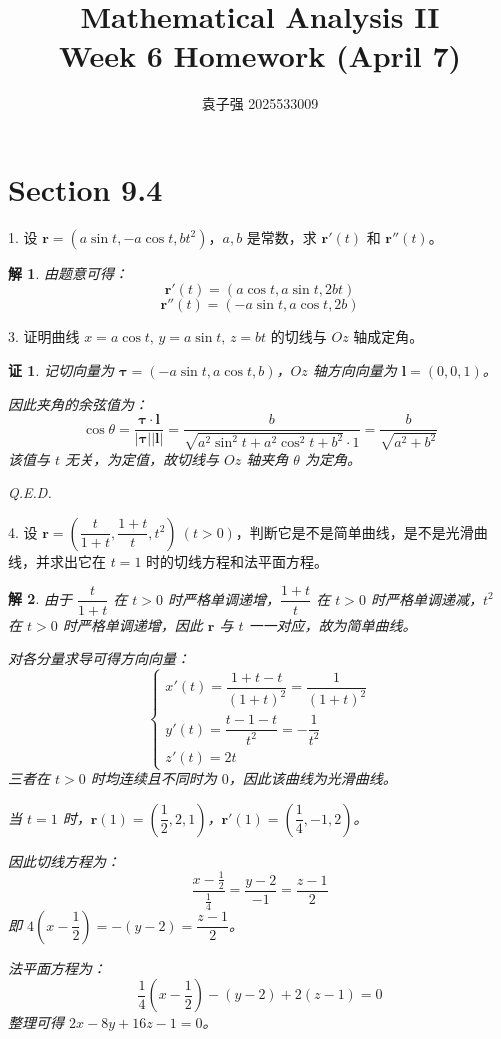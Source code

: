 \documentclass[a4paper,12pt]{article}
\title{Mathematical Analysis II\\Week 6 Homework (April 7)}
\author{袁子强\hspace{1cm} 2025533009}
\newtheorem*{pf}{证}
\newtheorem*{sol}{解}
\begin{document}
\maketitle

\section*{Section 9.4}

1. 设 $\boldsymbol{r}=(a\sin t, -a\cos t, bt^2)$，$a,b$ 是常数，求 $\boldsymbol{r}'(t)$ 和 $\boldsymbol{r}''(t)$。

\begin{sol}
    由题意可得：
    $$\boldsymbol{r}'(t)=(a\cos t,a\sin t,2bt)$$
    $$\boldsymbol{r}''(t)=(-a\sin t,a\cos t,2b)$$
\end{sol}

3. 证明曲线 $x=a\cos t,\,y=a\sin t,\,z=bt$ 的切线与 $Oz$ 轴成定角。

\begin{pf}
    记切向量为 $\boldsymbol{\tau}=(-a\sin t, a\cos t, b)$，$Oz$ 轴方向向量为 $\boldsymbol{l}=(0,0,1)$。

    因此夹角的余弦值为：
    $$\cos\theta=\frac{\boldsymbol{\tau} \cdot \boldsymbol{l}}{|\boldsymbol{\tau}||\boldsymbol{l}|}=\frac{b}{\sqrt{a^2\sin^2t+a^2\cos^2t+b^2}\cdot 1}=\frac{b}{\sqrt{a^2+b^2}}$$
    该值与 $t$ 无关，为定值，故切线与 $Oz$ 轴夹角 $\theta$ 为定角。

    Q.E.D.
\end{pf}

4. 设 $\boldsymbol{r}=\left(\dfrac{t}{1+t},\dfrac{1+t}{t},t^2\right)\ (t>0)$，判断它是不是简单曲线，是不是光滑曲线，并求出它在 $t=1$ 时的切线方程和法平面方程。

\begin{sol}
    由于 $\dfrac{t}{1+t}$ 在 $t>0$ 时严格单调递增，$\dfrac{1+t}{t}$ 在 $t>0$ 时严格单调递减，$t^2$ 在 $t>0$ 时严格单调递增，因此 $\boldsymbol{r}$ 与 $t$ 一一对应，故为简单曲线。

    对各分量求导可得方向向量：
    $$\begin{cases}
            x'(t)=\dfrac{1+t-t}{(1+t)^2}=\dfrac{1}{(1+t)^2} \\
            y'(t)=\dfrac{t-1-t}{t^2}=-\dfrac{1}{t^2}        \\
            z'(t)=2t
        \end{cases}$$
    三者在 $t>0$ 时均连续且不同时为 $0$，因此该曲线为光滑曲线。

    当 $t=1$ 时，$\boldsymbol{r}(1)=\left(\dfrac{1}{2},2,1\right)$，$\boldsymbol{r}'(1)=\left(\dfrac{1}{4},-1,2\right)$。

    因此切线方程为：
    $$\frac{x-\frac{1}{2}}{\frac{1}{4}}=\frac{y-2}{-1}=\frac{z-1}{2}$$
    即 $4\left(x-\dfrac{1}{2}\right)=-(y-2)=\dfrac{z-1}{2}$。

    法平面方程为：
    $$\frac{1}{4}\left(x-\frac{1}{2}\right)-(y-2)+2(z-1)=0$$
    整理可得 $2x-8y+16z-1=0$。
\end{sol}
\end{document}
